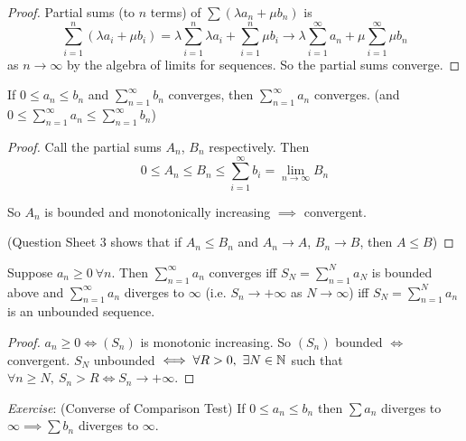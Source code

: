 \documentclass[10pt,twoside]{scrartcl}
\begin{document}
\begin{proof}
Partial sums (to $n$ terms) of $\sum (\lambda a_n + \mu b_n)$ is 
\[\sum_{i=1}^{n} (\lambda a_i + \mu b_i) = \lambda \sum_{i=1}^{n} \lambda a_i + \sum_{i=1}^{n} \mu b_i \to \lambda \sum_{i=1}^{\infty} a_n + \mu \sum_{i=1}^{\infty} \mu b_n \]
as $n \to \infty$ by the algebra of limits for sequences. So the partial sums converge.
\end{proof}\vspace*{10pt}



\begin{theorem}
If $0 \leq a_n \leq b_n$ and $\sum_{n=1}^{\infty} b_n$ converges, then $\sum_{n=1}^{\infty} a_n$ converges.	 (and $0 \leq \sum_{n=1}^{\infty}a_n \leq \sum_{n=1}^{\infty}b_n$)
\end{theorem}

\begin{proof}
Call the partial sums $A_n$, $B_n$ respectively. Then
\[0 \leq A_n \leq B_n \leq \sum_{i=1}^{\infty} b_i = \lim_{n\to \infty}B_n\]	

So $A_n$ is bounded and monotonically increasing $\implies$ convergent.
 
(Question Sheet 3 shows that if $A_n \leq B_n$ and $A_n \to A$, $B_n \to B$, then $A \leq B$)
\end{proof}\vspace*{5pt}


\begin{proposition}
Suppose $a_n \geq 0 ~\forall n$. Then $\sum_{n=1}^{\infty} a_n$ converges iff $S_N = \sum_{n=1}^{N}a_N$ is bounded above and $\sum_{n=1}^{\infty} a_n$ diverges to $\infty$ (i.e. $S_n \to +\infty$ as $N \to \infty$) iff $S_N = \sum_{n=1}^{N} a_n$ is an unbounded sequence. 
\end{proposition}

\begin{proof}
$a_n \geq 0 \iff (S_n)$ is monotonic increasing. So $(S_n)$ bounded $\iff$ convergent. $S_N$ unbounded $\iff \forall R>0,~ \exists N \in \mathbb{N}$ such that $\forall n \geq N,~ S_n > R \iff S_n \to +\infty$. 
\end{proof}\vspace*{5pt}

\emph{Exercise}: (Converse of Comparison Test)
If $0 \leq a_n \leq b_n$ then $\sum a_n$ diverges to $\infty\implies \sum b_n$ diverges to $\infty$.\\
\end{document}

